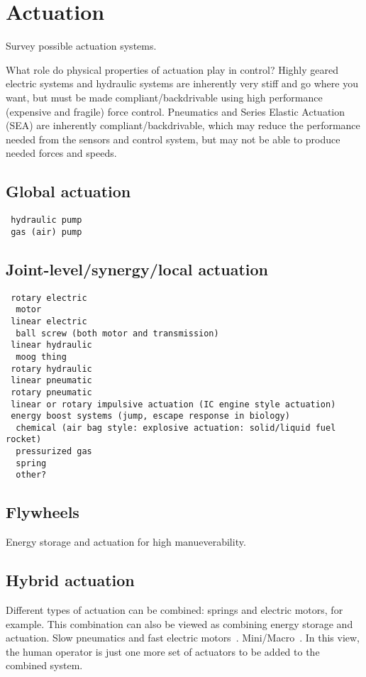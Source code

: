 \documentclass[letterpaper,12pt,fullpage]{article}
\begin{document}
\section{Actuation}

Survey possible actuation systems.

What role do physical properties of actuation play in control? Highly
geared electric systems and hydraulic systems are inherently very
stiff and go where you want, but must be made compliant/backdrivable
using high performance (expensive and fragile) force control.
Pneumatics and Series Elastic Actuation (SEA) are inherently
compliant/backdrivable, which may reduce the performance
needed from the sensors and control system, but may not be able to
produce needed forces and speeds.

\subsection{Global actuation}

\begin{verbatim}
 hydraulic pump 
 gas (air) pump
\end{verbatim}

\subsection{Joint-level/synergy/local actuation}

\begin{verbatim}
 rotary electric
  motor
 linear electric
  ball screw (both motor and transmission)
 linear hydraulic
  moog thing
 rotary hydraulic
 linear pneumatic
 rotary pneumatic
 linear or rotary impulsive actuation (IC engine style actuation)
 energy boost systems (jump, escape response in biology)
  chemical (air bag style: explosive actuation: solid/liquid fuel rocket)
  pressurized gas
  spring
  other?
\end{verbatim}

\subsection{Flywheels}

Energy storage and actuation for high manueverability.

\subsection{Hybrid actuation}

Different types of actuation can be combined: springs and electric motors,
for example. This combination can also be viewed as combining energy
storage and actuation. Slow pneumatics and fast electric motors~\cite{Morimoto,UCLA}.
Mini/Macro~\cite{Stanford}. In this view, the human operator is just
one more set of actuators to be added to the combined system.
\end{document}
